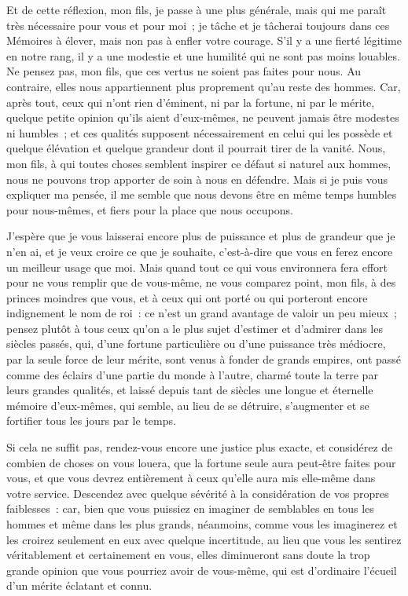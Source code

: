 \documentclass[french,twoside]{book} %
\begin{document}
Et de cette réflexion, mon fils, je passe à une plus générale, mais qui me paraît très nécessaire pour vous et pour moi ; je tâche et je tâcherai toujours dans ces Mémoires à élever, mais non pas à enfler votre courage. S’il y a une fierté légitime en notre rang, il y a une modestie et une humilité qui ne sont pas moins louables. Ne pensez pas, mon fils, que ces vertus ne soient pas faites pour nous. Au contraire, elles nous appartiennent plus proprement qu’au reste des hommes. Car, après tout, ceux qui n’ont rien d’éminent, ni par la fortune, ni par le mérite, quelque petite opinion qu’ils aient d’eux-mêmes, ne peuvent jamais être modestes ni humbles ; et ces qualités supposent nécessairement en celui qui les possède et quelque élévation et quelque grandeur dont il pourrait tirer de la vanité. Nous, mon fils, à qui toutes choses semblent inspirer ce défaut si naturel aux hommes, nous ne pouvons trop apporter de soin à nous en défendre. Mais si je puis vous expliquer ma pensée, il me semble que nous devons être en même temps humbles pour nous-mêmes, et fiers pour la place que nous occupons.\par
J’espère que je vous laisserai encore plus de puissance et plus de grandeur que je n’en ai, et je veux croire ce que je souhaite, c’est-à-dire que vous en ferez encore un meilleur usage que moi. Mais quand tout ce qui vous environnera fera effort pour ne vous remplir que de vous-même, ne vous comparez point, mon fils, à des princes moindres que vous, et à ceux qui ont porté ou qui porteront encore indignement le nom de roi : ce n’est un grand avantage de valoir un peu mieux ; pensez plutôt à tous ceux qu’on a le plus sujet d’estimer et d’admirer dans les siècles passés, qui, d’une fortune particulière ou d’une puissance très médiocre, par la seule force de leur mérite, sont venus à fonder de grands empires, ont passé comme des éclairs d’une partie du monde à l’autre, charmé toute la terre par leurs grandes qualités, et laissé depuis tant de siècles une longue et éternelle mémoire d’eux-mêmes, qui semble, au lieu de se détruire, s’augmenter et se fortifier tous les jours par le temps.\par
Si cela ne suffit pas, rendez-vous encore une justice plus exacte, et considérez de combien de choses on vous louera, que la fortune seule aura peut-être faites pour vous, et que vous devrez entièrement à ceux qu’elle aura mis elle-même dans votre service. Descendez avec quelque sévérité à la considération de vos propres faiblesses : car, bien que vous puissiez en imaginer de semblables en tous les hommes et même dans les plus grands, néanmoins, comme vous les imaginerez et les croirez seulement en eux avec quelque incertitude, au lieu que vous les sentirez véritablement et certainement en vous, elles diminueront sans doute la trop grande opinion que vous pourriez avoir de vous-même, qui est d’ordinaire l’écueil d’un mérite éclatant et connu.\par
\end{document}
